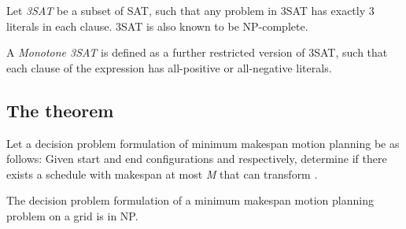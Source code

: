 \begin{definition}
	Let \emph{3SAT} be a subset of SAT, such that any problem in 3SAT has exactly 3 literals in each clause. 3SAT is also known to be NP-complete.
\end{definition}

\begin{definition}
	A \emph{Monotone 3SAT} is defined as a further restricted version of 3SAT, such that each clause of the expression has all-positive or all-negative literals. 
\end{definition}










\subsection{The theorem}


Let a decision problem formulation of minimum makespan motion planning be as follows: Given start and end configurations  and  respectively, determine if there exists a schedule with makespan at most \emph{M} that can transform .

\begin{lemma}\label{lemma:np}
	The decision problem formulation of a minimum makespan motion planning problem on a grid is in NP.
\end{lemma}

